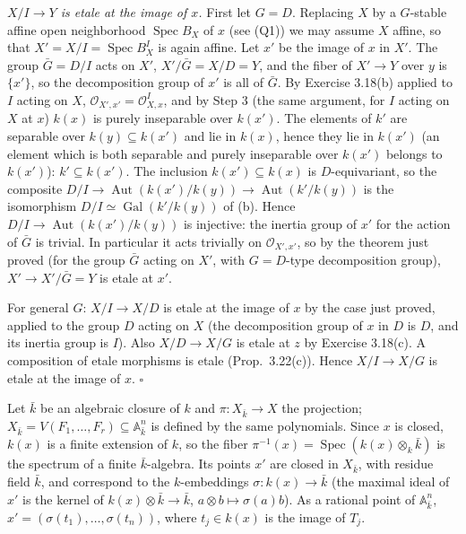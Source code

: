 \documentclass[11pt]{article}
\begin{document}
\emph{$X/I\to Y$ is etale at the image of $x$.} First let $G=D$. Replacing $X$ by a $G$-stable affine open neighborhood $\operatorname{Spec}B_X$ of $x$ (see (Q1)) we may assume $X$ affine, so that $X'=X/I=\operatorname{Spec}B_X^I$ is again affine. Let $x'$ be the image of $x$ in $X'$. The group $\bar G=D/I$ acts on $X'$, $X'/\bar G=X/D=Y$, and the fiber of $X'\to Y$ over $y$ is $\{x'\}$, so the decomposition group of $x'$ is all of $\bar G$. By Exercise 3.18(b) applied to $I$ acting on $X$, $\mathcal O_{X',x'}=\mathcal O_{X,x}^I$, and by Step 3 (the same argument, for $I$ acting on $X$ at $x$) $k(x)$ is purely inseparable over $k(x')$. The elements of $k'$ are separable over $k(y)\subseteq k(x')$ and lie in $k(x)$, hence they lie in $k(x')$ (an element which is both separable and purely inseparable over $k(x')$ belongs to $k(x')$): $k'\subseteq k(x')$. The inclusion $k(x')\subseteq k(x)$ is $D$-equivariant, so the composite $D/I\to\operatorname{Aut}(k(x')/k(y))\to\operatorname{Aut}(k'/k(y))$ is the isomorphism $D/I\simeq\operatorname{Gal}(k'/k(y))$ of (b). Hence $D/I\to\operatorname{Aut}(k(x')/k(y))$ is injective: the inertia group of $x'$ for the action of $\bar G$ is trivial. In particular it acts trivially on $\mathcal O_{X',x'}$, so by the theorem just proved (for the group $\bar G$ acting on $X'$, with $G=D$-type decomposition group), $X'\to X'/\bar G=Y$ is etale at $x'$.

For general $G$: $X/I\to X/D$ is etale at the image of $x$ by the case just proved, applied to the group $D$ acting on $X$ (the decomposition group of $x$ in $D$ is $D$, and its inertia group is $I$). Also $X/D\to X/G$ is etale at $z$ by Exercise 3.18(c). A composition of etale morphisms is etale (Prop.~3.22(c)). Hence $X/I\to X/G$ is etale at the image of $x$. \hfill$\square$

\pf
Let $\bar k$ be an algebraic closure of $k$ and $\pi:X_{\bar k}\to X$ the projection; $X_{\bar k}=V(F_1,\dots,F_r)\subseteq\mathbb A^n_{\bar k}$ is defined by the same polynomials. Since $x$ is closed, $k(x)$ is a finite extension of $k$, so the fiber $\pi^{-1}(x)=\operatorname{Spec}(k(x)\otimes_k\bar k)$ is the spectrum of a finite $\bar k$-algebra. Its points $x'$ are closed in $X_{\bar k}$, with residue field $\bar k$, and correspond to the $k$-embeddings $\sigma:k(x)\to\bar k$ (the maximal ideal of $x'$ is the kernel of $k(x)\otimes\bar k\to\bar k$, $a\otimes b\mapsto\sigma(a)b$). As a rational point of $\mathbb A^n_{\bar k}$, $x'=(\sigma(t_1),\dots,\sigma(t_n))$, where $t_j\in k(x)$ is the image of $T_j$.
\end{document}
